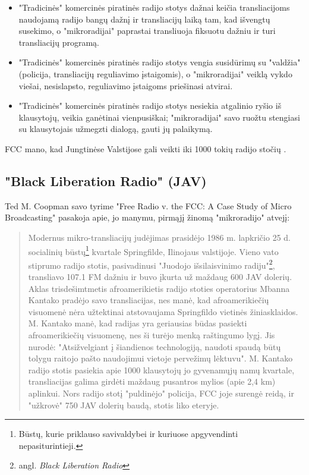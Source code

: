 \documentclass[kursinis-darbas]{vukf}
\begin{document}
\begin{itemize}
	\item "Tradicinės" komercinės piratinės radijo stotys dažnai keičia transliacijoms naudojamą radijo bangų dažnį ir transliacijų laiką tam, kad išvengtų susekimo, o "mikroradijai" paprastai transliuoja fiksuotu dažniu ir turi transliacijų programą.
	\item "Tradicinės" komercinės piratinės radijo stotys vengia susidūrimų su "valdžia" (policija, transliacijų reguliavimo įstaigomis), o "mikroradijai" veiklą vykdo viešai, nesislapsto, reguliavimo įstaigoms priešinasi atvirai.
	\item "Tradicinės" komercinės piratinės radijo stotys nesiekia atgalinio ryšio iš klausytojų, veikia ganėtinai vienpusiškai; "mikroradijai" savo ruožtu stengiasi su klausytojais užmegzti dialogą, gauti jų palaikymą.
\end{itemize}

\gls{FCC} mano, kad Jungtinėse Valstijose gali veikti iki 1000 tokių radijo stočių \cite[p.~1]{tmc_fcc_enforcement_difficulties_with_unlicensed_micro_radio}.


\subsection{"Black Liberation Radio" (JAV)}

Ted M. Coopman savo tyrime "Free Radio v. the \gls{FCC}: A Case Study of Micro Broadcasting" \cite{tmc_free_radio_vs_the_fcc_a_case_study_of_micro_broadcasting} pasakoja apie, jo manymu, pirmąjį žinomą "mikroradijo" atvejį:

\begin{quotation}
	Modernus mikro-transliacijų judėjimas prasidėjo 1986 m. lapkričio 25 d. socialinių būstų\footnote{Būstų, kurie priklauso savivaldybei ir kuriuose apgyvendinti nepasiturintieji.} kvartale Springfilde, Ilinojaus valstijoje. Vieno vato stiprumo radijo stotis, pasivadinusi "Juodojo išsilaisvinimo radiju"\footnote{angl. \emph{Black Liberation Radio}}, transliavo 107.1 FM dažniu ir buvo įkurta už maždaug 600 JAV dolerių.
	Aklas trisdešimtmetis afroamerikietis radijo stoties operatorius Mbanna Kantako pradėjo savo transliacijas, nes manė, kad afroamerikiečių visuomenė nėra užtektinai atstovaujama Springfildo vietinės žiniasklaidos. M. Kantako manė, kad radijas yra geriausias būdas pasiekti afroamerikiečių visuomenę, nes ši turėjo menką raštingumo lygį.
	Jis nurodė: "Atsižvelgiant į šiandienos technologiją, naudoti spaudą būtų tolygu raitojo pašto naudojimui vietoje pervežimų lėktuvu".
	M. Kantako radijo stotis pasiekia apie 1000 klausytojų jo gyvenamųjų namų kvartale, transliacijas galima girdėti maždaug pusantros mylios (apie 2,4 km) aplinkui. Nors radijo stotį "puldinėjo" policija, \gls{FCC} joje surengė reidą, ir "užkrovė" 750 JAV dolerių baudą, stotis liko eteryje.
\end{quotation}
\end{document}
